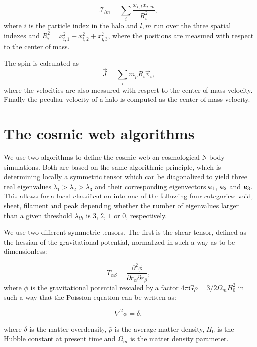 \documentclass[usenatbib]{mn2e}
\begin{document}
\begin{equation}
{\mathcal T}_{lm} = \sum_{i}\frac{x_{i,l}x_{i,m}}{R_i^2}, 
\end{equation}
where $i$ is the particle index in the halo and $l,m$ run over the
three spatial indexes  and $R_i^2 = x_{i,1}^2 + x_{i,2}^2 +
x_{i,3}^2$, where the positions are measured with respect to the
center of mass.

The spin is calculated as
\begin{equation}
\vec{J} = \sum_{i}m_p{R_i}\vec{v}_i, 
\end{equation}
where the velocities are also measured with respect to the center of
mass velocity. Finally the peculiar velocity of a halo is computed as
the center of mass velocity.


\section{The cosmic web algorithms}
\label{sec:algorithms}
We use two algorithms to define the cosmic web on cosmological N-body
simulations. Both are based on the same algorithmic principle, which
is determining locally a symmetric tensor which can be diagonalized to yield
three real eigenvalues $\lambda_1>\lambda_2>\lambda_3$ and their
corresponding eigenvectors ${\bf e}_{1}$, ${\bf e}_2$ and ${\bf
  e}_3$. This allows for a local classification into one of the
following four categories: void, sheet, filament and peak depending
whether the number of eigenvalues larger than a given threshold
$\lambda_{th}$ is $3$, $2$, $1$ or $0$, respectively.

We use two different symmetric tensors. The first is the shear tensor,
defined as the hessian of the gravitational potential, normalized in
such a way as to be dimensionless:

\begin{equation}
T_{\alpha\beta} = \frac{\partial^2\phi}{\partial
  r_{\alpha}\partial r_{\beta}}, 
\end{equation}
where $\phi$ is the gravitational potential rescaled by a factor $4\pi
G\bar{\rho}=3/2\Omega_m H_{0}^2$ in such a way that the Poission
equation can be written as:

\begin{equation}
\nabla^{2}\phi  = \delta, 
\end{equation}

where $\delta$ is the matter overdensity, $\bar{\rho}$ is the average
matter density, $H_{0}$ is the Hubble constant at present time and
$\Omega_m$ is the matter density parameter.
\end{document}
